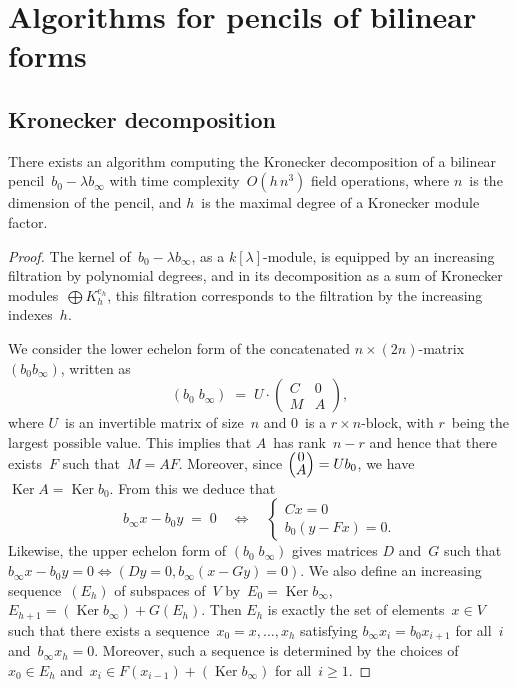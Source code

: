 \documentclass{lms}
\def\mat#1{\begin{pmatrix}#1\end{pmatrix}}
\def\smat{\def\arraystretch{.66}\mat}
\DeclareMathOperator\Ker{Ker}
\begin{document}
\appendix
\section{Algorithms for pencils of bilinear forms}
\label{ap:bilinear}
\subsection{Kronecker decomposition}
\label{ap:kronecker}

\begin{prop}
There exists an algorithm computing the Kronecker decomposition
of a bilinear pencil~$b_0 -λ b_∞$
with time complexity~$O(h\, n^3)$ field operations,
where $n$~is the dimension of the pencil,
and $h$~is the maximal degree of a Kronecker module factor.
\end{prop}
\begin{proof}
The kernel of~$b_0 - λ b_∞$, as a $k[λ]$-module,
is equipped by an increasing filtration by polynomial degrees,
and in its decomposition as a sum of Kronecker modules~$⨁ K_h^{e_h}$,
this filtration corresponds to the filtration by the increasing
indexes~$h$.

\medbreak

We consider the lower echelon form
of the concatenated $n × (2n)$-matrix $(b_0 b_∞)$, written as
\begin{equation}
(b_0 \; b_∞) \;=\; U · \mat{C & 0 \\ M & A},
\end{equation}
where $U$~is an invertible matrix of size~$n$
and $0$~is a $r × n$-block, with $r$~being the largest possible value.
This implies that $A$~has rank~$n-r$ and hence that
there exists~$F$ such that~$M = A F$.
Moreover, since $\smat{0\\A} = U b_0$, we have~$\Ker A = \Ker b_0$.
From this we deduce that
\begin{equation}
b_∞ x - b_0 y \;=\; 0 \quad ⇔ \quad
  \begin{cases} C x = 0 \\ b_0 (y - F x) = 0.\end{cases}
\end{equation}
Likewise, the upper echelon form of $(b_0\;b_∞)$
gives matrices $D$ and~$G$ such that
$b_∞ x - b_0 y = 0 ⇔ (D y = 0, b_∞ (x - G y) = 0)$.
We also define an increasing sequence~$(E_h)$ of subspaces of~$V$
by~$E_0 = \Ker b_∞$, $E_{h+1} = (\Ker b_∞) + G(E_h)$.
Then $E_h$ is exactly the set of elements~$x ∈ V$ such that there exists
a sequence~$x_0 = x, …, x_h$ satisfying $b_∞ x_i = b_0 x_{i+1}$ for all~$i$
and~$b_∞ x_h = 0$.
Moreover, such a sequence is determined by the choices
of~$x_0 ∈ E_h$ and~$x_{i} ∈ F(x_{i-1}) + (\Ker b_∞)$ for all~$i ≥ 1$.


\end{proof}
\end{document}
